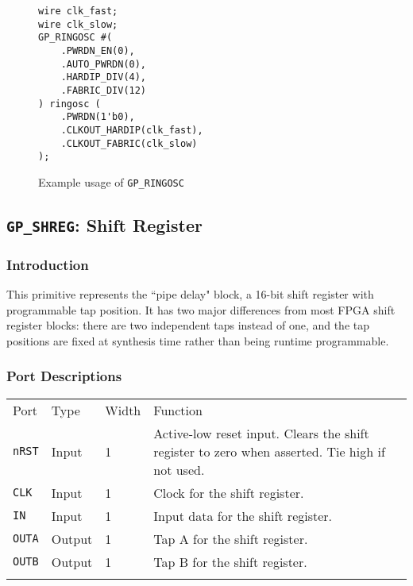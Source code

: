 \documentclass[11pt]{article}
\newcommand{\tokenstyle}[1]{\texttt{#1}}
\newcommand{\whenstyle}[1]{{\fontseries{sb}\selectfont#1}}
\newcommand{\thinhline}{\Xhline{1\arrayrulewidth}}
\newcommand{\thickhline}{\Xhline{2.5\arrayrulewidth}}
\begin{document}
\begin{figure}[h]
\begin{lstlisting}
wire clk_fast;
wire clk_slow;
GP_RINGOSC #(
	.PWRDN_EN(0),
	.AUTO_PWRDN(0),
	.HARDIP_DIV(4),
	.FABRIC_DIV(12)
) ringosc (
	.PWRDN(1'b0),
	.CLKOUT_HARDIP(clk_fast),
	.CLKOUT_FABRIC(clk_slow)
);
\end{lstlisting}
\caption{Example usage of \tokenstyle{GP\_RINGOSC}}
\label{gp-ringosc-example}
\end{figure}


\pagebreak
\clearpage
\subsection{\tokenstyle{GP\_SHREG}: Shift Register}
\label{gp-shreg}

\subsubsection{Introduction}

This primitive represents the ``pipe delay" block, a 16-bit shift register with programmable tap position. It has two
major differences from most FPGA shift register blocks: there are two independent taps instead of one, and the tap
positions are fixed at synthesis time rather than being runtime programmable.

\subsubsection{Port Descriptions}

\begin{tabularx}{\textwidth}{lllX}
\thinhline
\whenstyle{Port} & \whenstyle{Type} & \whenstyle{Width} & \whenstyle{Function} \\
\thickhline
\tokenstyle{nRST} & Input & 1 & Active-low reset input. Clears the shift register to zero when asserted. Tie high if not used.\\
\thinhline
\tokenstyle{CLK} & Input & 1 & Clock for the shift register. \\
\thinhline
\tokenstyle{IN} & Input & 1 & Input data for the shift register. \\
\thinhline
\tokenstyle{OUTA} & Output & 1 & Tap A for the shift register. \\
\thinhline
\tokenstyle{OUTB} & Output & 1 & Tap B for the shift register. \\
\thinhline
\end{tabularx}
\end{document}
